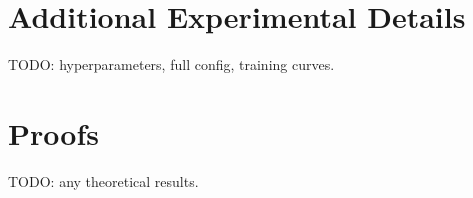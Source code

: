 
\section{Additional Experimental Details}
\label{app:details}

TODO: hyperparameters, full config, training curves.

\section{Proofs}
\label{app:proofs}

TODO: any theoretical results.
